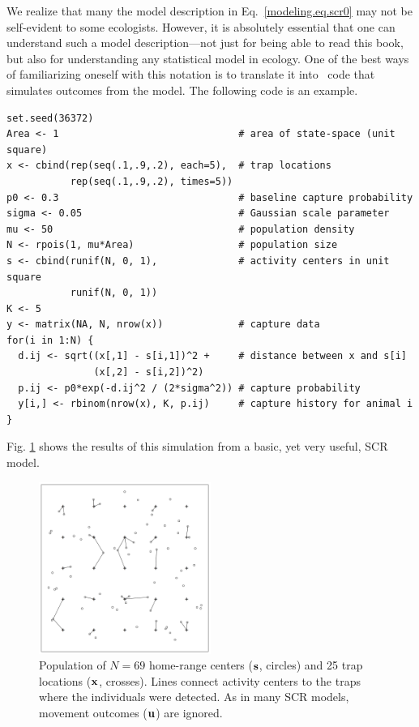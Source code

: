 We realize that many the model description in Eq.~\ref{modeling.eq.scr0} may not be
self-evident to some ecologists. However, it is absolutely essential
that one can understand such a model description---not just for being
able to read this book, but also for understanding any statistical
model in ecology. One of the best ways of familiarizing oneself with
this notation is to translate it into \R~code that simulates outcomes
from the model. The following code is an example.
\begin{small}
\begin{verbatim}
set.seed(36372)
Area <- 1                               # area of state-space (unit square)
x <- cbind(rep(seq(.1,.9,.2), each=5),  # trap locations
           rep(seq(.1,.9,.2), times=5))
p0 <- 0.3                               # baseline capture probability
sigma <- 0.05                           # Gaussian scale parameter
mu <- 50                                # population density
N <- rpois(1, mu*Area)                  # population size
s <- cbind(runif(N, 0, 1),              # activity centers in unit square
           runif(N, 0, 1))
K <- 5
y <- matrix(NA, N, nrow(x))             # capture data
for(i in 1:N) {
  d.ij <- sqrt((x[,1] - s[i,1])^2 +     # distance between x and s[i]
               (x[,2] - s[i,2])^2)
  p.ij <- p0*exp(-d.ij^2 / (2*sigma^2)) # capture probability
  y[i,] <- rbinom(nrow(x), K, p.ij)     # capture history for animal i
}
\end{verbatim}
\end{small}
Fig. \ref{modeling.fig.fig1} shows the results of this simulation from a
basic, yet very useful, SCR model.

\begin{figure}
\begin{center}
\includegraphics[width=0.5\textwidth]{Ch2/figs/SCR0}
\end{center}
\caption{Population of $N=69$ home-range centers ($\bf s$,
  circles) and 25 trap locations ($\bf x$, crosses). Lines connect
  activity centers to the traps where the individuals were
  detected. As in many SCR models, movement outcomes ($\bf u$)
  are ignored.}
\label{modeling.fig.fig1}
\end{figure}


